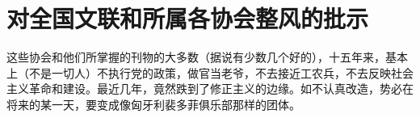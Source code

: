 \section[对全国文联和所属各协会整风的批示（一九六四年六月二十七日）]{对全国文联和所属各协会整风的批示}


这些协会和他们所掌握的刊物的大多数（据说有少数几个好的），十五年来，基本上（不是一切人）不执行党的政策，做官当老爷，不去接近工农兵，不去反映社会主义革命和建设。最近几年，竟然跌到了修正主义的边缘。如不认真改造，势必在将来的某一天，要变成像匈牙利裴多菲俱乐部那样的团体。


